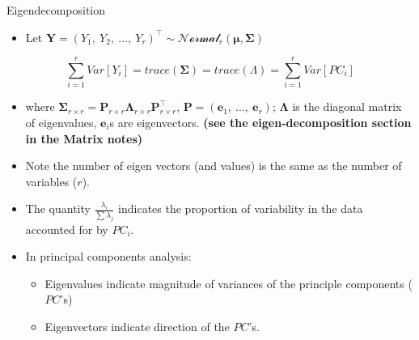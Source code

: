 \documentclass[
  9pt,
  ignorenonframetext,
]{beamer}
\providecommand{\tightlist}{%
  \setlength{\itemsep}{0pt}\setlength{\parskip}{0pt}}
\begin{document}
\begin{frame}{Eigendecomposition}
\protect\hypertarget{eigendecomposition}{}
\begin{itemize}
\tightlist
\item
  Let
  \(\pmb Y = (Y_1,\ Y_2,\ ...,\ Y_r)^{\top} \sim \mathcal {Normal}_r(\pmb \mu, \pmb \Sigma)\)
\end{itemize}

\[
\sum_{i=1}^rVar[Y_i] = trace(\pmb \Sigma)
= trace(\Lambda) = \sum^r_{i=1} Var[PC_i]
\]

\begin{itemize}
\tightlist
\item
  where
  \(\pmb \Sigma_{r \times r} = \pmb {P}_{r \times r} \pmb {\Lambda}_{r \times r} \pmb P^{\top}_{r \times r}\),
  \(\pmb P = (\pmb e_1,\ ...,\ \pmb e_r)\); \(\pmb \Lambda\) is the
  diagonal matrix of eigenvalues, \(\pmb e_i\)s are eigenvectors.
  \textbf{(see the eigen-decomposition section in the Matrix notes)}
\item
  Note the number of eigen vectors (and values) is the same as the
  number of variables (\(r\)).
\item
  The quantity \(\frac {\lambda_i} {\sum \lambda_j}\) indicates the
  proportion of variability in the data accounted for by \(PC_i\).
\item
  In principal components analysis:

  \begin{itemize}
  \tightlist
  \item
    Eigenvalues indicate magnitude of variances of the principle
    components (\(PC\)'s)
  \item
    Eigenvectors indicate direction of the \(PC\)'s.
  \end{itemize}
\end{itemize}
\end{frame}
\end{document}
